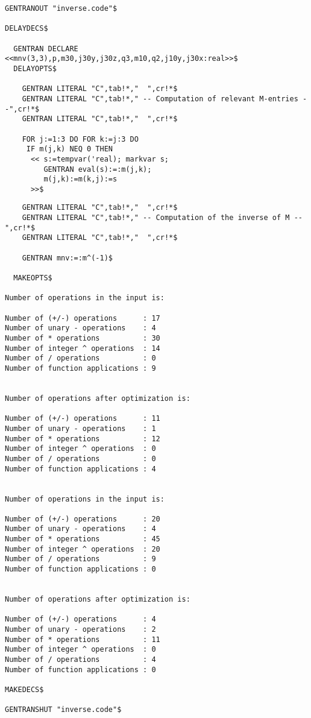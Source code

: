 {{\begin{verbatim}
GENTRANOUT "inverse.code"$

DELAYDECS$

  GENTRAN DECLARE <<mnv(3,3),p,m30,j30y,j30z,q3,m10,q2,j10y,j30x:real>>$
  DELAYOPTS$

    GENTRAN LITERAL "C",tab!*,"  ",cr!*$
    GENTRAN LITERAL "C",tab!*," -- Computation of relevant M-entries --",cr!*$
    GENTRAN LITERAL "C",tab!*,"  ",cr!*$

    FOR j:=1:3 DO FOR k:=j:3 DO
     IF m(j,k) NEQ 0 THEN
      << s:=tempvar('real); markvar s;
         GENTRAN eval(s):=:m(j,k);
         m(j,k):=m(k,j):=s
      >>$
\end{verbatim}}
{\small
\begin{verbatim}
    GENTRAN LITERAL "C",tab!*,"  ",cr!*$
    GENTRAN LITERAL "C",tab!*," -- Computation of the inverse of M --",cr!*$
    GENTRAN LITERAL "C",tab!*,"  ",cr!*$

    GENTRAN mnv:=:m^(-1)$

  MAKEOPTS$

Number of operations in the input is: 

Number of (+/-) operations      : 17
Number of unary - operations    : 4
Number of * operations          : 30
Number of integer ^ operations  : 14
Number of / operations          : 0
Number of function applications : 9


Number of operations after optimization is:

Number of (+/-) operations      : 11
Number of unary - operations    : 1
Number of * operations          : 12
Number of integer ^ operations  : 0
Number of / operations          : 0
Number of function applications : 4


Number of operations in the input is: 

Number of (+/-) operations      : 20
Number of unary - operations    : 4
Number of * operations          : 45
Number of integer ^ operations  : 20
Number of / operations          : 9
Number of function applications : 0


Number of operations after optimization is:

Number of (+/-) operations      : 4
Number of unary - operations    : 2
Number of * operations          : 11
Number of integer ^ operations  : 0
Number of / operations          : 4
Number of function applications : 0

MAKEDECS$

GENTRANSHUT "inverse.code"$
\end{verbatim}}

}
